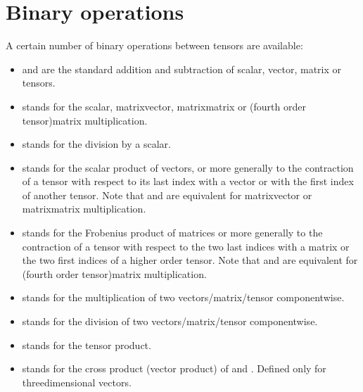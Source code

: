 \documentclass[a4paper,11pt,english]{sphinxmanual}
\begin{document}
\section{Binary operations}
\label{\detokenize{userdoc/gasm_high:binary-operations}}
A certain number of binary operations between tensors are available:
\begin{itemize}
\item {} 
\sphinxcode{\sphinxupquote{+}} and \sphinxcode{\sphinxupquote{\sphinxhyphen{}}} are the standard addition and subtraction of scalar, vector, matrix or tensors.

\item {} 
\sphinxcode{\sphinxupquote{*}} stands for the scalar, matrix\sphinxhyphen{}vector, matrix\sphinxhyphen{}matrix or (fourth order tensor)\sphinxhyphen{}matrix multiplication.

\item {} 
\sphinxcode{\sphinxupquote{/}} stands for the division by a scalar.

\item {} 
 stands for the scalar product of vectors, or more generally to the contraction of a tensor with respect to its last index with a vector or with the first index of another tensor. Note that \sphinxcode{\sphinxupquote{*}} and  are equivalent for matrix\sphinxhyphen{}vector or matrix\sphinxhyphen{}matrix multiplication.

\item {} 
\sphinxcode{\sphinxupquote{:}} stands for the Frobenius product of matrices or more generally to the contraction of a tensor with respect to the two last indices with a matrix or the two first indices of a higher order tensor. Note that \sphinxcode{\sphinxupquote{*}} and \sphinxcode{\sphinxupquote{:}} are equivalent for (fourth order tensor)\sphinxhyphen{}matrix multiplication.

\item {} 
 stands for the multiplication of two vectors/matrix/tensor componentwise.

\item {} 
 stands for the division of two vectors/matrix/tensor componentwise.

\item {} 
 stands for the tensor product.

\item {} 
 stands for the cross product (vector product) of  and . Defined only for three\sphinxhyphen{}dimensional vectors.


\end{itemize}
\end{document}
